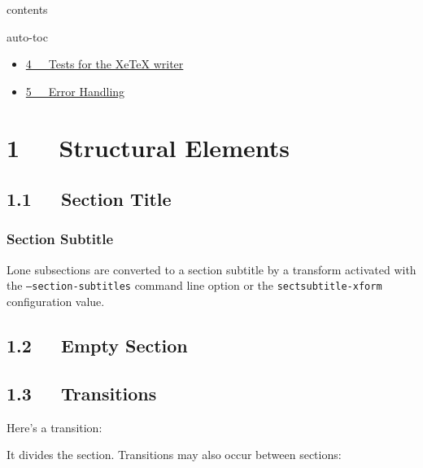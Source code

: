 \documentclass[a4paper]{article}
\begin{document}
\begin{DUclass}{contents}
\begin{DUclass}{auto-toc}
\begin{itemize}
\begin{DUclass}{auto-toc}
\begin{itemize}
\item \hyperref[class-handling]{3.2   class handling}
\end{itemize}
\end{DUclass}

\item \hyperref[tests-for-the-xetex-writer]{4   Tests for the XeTeX writer}

\item \hyperref[error-handling]{5   Error Handling}
\end{itemize}
\end{DUclass}
\end{DUclass}


\section{1   Structural Elements%
  \label{structural-elements}%
}


\subsection{1.1   Section Title%
  \label{section-title}%
}
\subsubsection*{Section Subtitle}

Lone subsections are converted to a section subtitle by a transform
activated with the \texttt{--section-subtitles} command line option or the
\texttt{sectsubtitle-xform} configuration value.


\subsection{1.2   Empty Section%
  \label{empty-section}%
}


\subsection{1.3   Transitions%
  \label{transitions}%
}

Here’s a transition:

\DUtransition

It divides the section.  Transitions may also occur between sections:

\DUtransition
\end{document}
